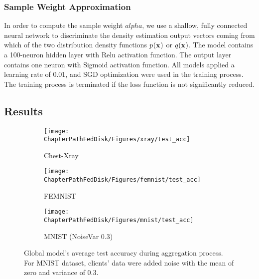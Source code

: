 \subsubsection{Sample Weight Approximation} In order to compute the sample weight $alpha$, we use a shallow, fully connected neural network to discriminate the density estimation output vectors coming from which of the two distribution density functions $p_{}(\mathbf{x_{}})$ or $q_{}(\mathbf{x_{}})$. The model contains a 100-neuron hidden layer with Relu activation function. The output layer contains one neuron with Sigmoid activation function. All models applied a learning rate of 0.01, and SGD optimization were used in the training process. The training process is terminated if the loss function is not significantly reduced.

\subsection{Results}
\begin{figure*}[ht!]
	\centering
	\begin{subfigure}[t]{0.3\linewidth}	
		\texttt{[image: \\ChapterPathFedDisk/Figures/xray/test\_acc]}
		\caption{Chest-Xray }
		\label{fig:acc_xray}
	\end{subfigure}
	\hspace{0.01em}%
	\begin{subfigure}[t]{0.3\linewidth}
		\texttt{[image: \\ChapterPathFedDisk/Figures/femnist/test\_acc]}
		\caption{FEMNIST}
		\label{fig:acc_femnist}
	\end{subfigure}
	\hspace{0.01em}%
	\begin{subfigure}[t]{0.3\linewidth}	
		\texttt{[image: \\ChapterPathFedDisk/Figures/mnist/test\_acc]}
		\caption{MNIST (NoiseVar 0.3)  }
		\label{fig:acc_mnist}
	\end{subfigure}
	\caption[Classification accuracy over global iterations.]{Global model's average test accuracy during aggregation process. For MNIST dataset, clients' data were added noise with the mean of zero and variance of 0.3.}
	\label{fig:acc_all}
\end{figure*}


